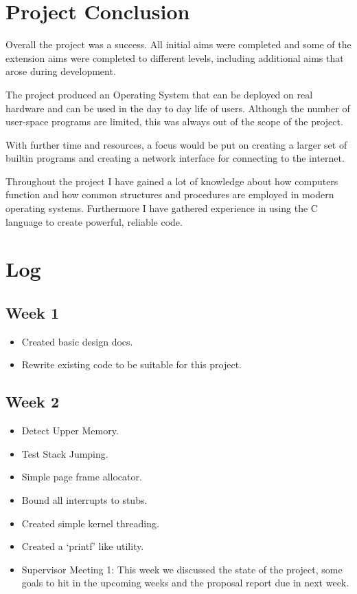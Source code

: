 \documentclass[a4paper]{report}
\begin{document}
\chapter{Project Conclusion}

Overall the project was a success. All initial aims were completed and some of the extension aims were completed to different levels, including additional aims that arose during development. 

The project produced an Operating System that can be deployed on real hardware and can be used in the day to day life of users. Although the number of user-space programs are limited, this was always out of the scope of the project.

With further time and resources, a focus would be put on creating a larger set of builtin programs and creating a network interface for connecting to the internet.

Throughout the project I have gained a lot of knowledge about how computers function and how common structures and procedures are employed in modern operating systems. Furthermore I have gathered experience in using the C language to create powerful, reliable code.



\chapter{Log}


\section*{Week 1}
\begin{itemize}
\item Created basic design docs.
\item Rewrite existing code to be suitable for this project.
\end{itemize}

\section*{Week 2}
\begin{itemize}
\item Detect Upper Memory.
\item Test Stack Jumping.
\item Simple page frame allocator.
\item Bound all interrupts to stubs.
\item Created simple kernel threading.
\item Created a `printf' like utility.
\item Supervisor Meeting 1: This week we discussed the state of the project, some goals to hit in the upcoming weeks and the proposal report due in next week.
\end{itemize}
\end{document}
